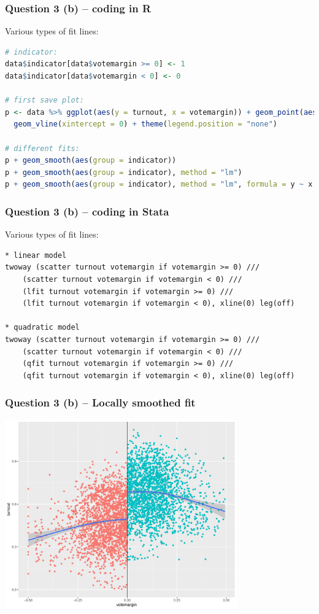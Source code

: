 \documentclass[xcolor=table,dvipsnames]{beamer}
\begin{document}
\begin{frame}[fragile]
\frametitle{Question 3 (b) -- coding in R}
Various types of fit lines:
\begin{lstlisting}[language=R]
# indicator:
data$indicator[data$votemargin >= 0] <- 1
data$indicator[data$votemargin < 0] <- 0

# first save plot:
p <- data %>% ggplot(aes(y = turnout, x = votemargin)) + geom_point(aes(colour = indicator)) + 
  geom_vline(xintercept = 0) + theme(legend.position = "none")

# different fits:
p + geom_smooth(aes(group = indicator))
p + geom_smooth(aes(group = indicator), method = "lm")
p + geom_smooth(aes(group = indicator), method = "lm", formula = y ~ x + I(x^2))
\end{lstlisting}
\end{frame}

\begin{frame}[fragile]
\frametitle{Question 3 (b) -- coding in Stata}
Various types of fit lines:
\begin{lstlisting}
* linear model
twoway (scatter turnout votemargin if votemargin >= 0) ///
	(scatter turnout votemargin if votemargin < 0) ///
	(lfit turnout votemargin if votemargin >= 0) ///
	(lfit turnout votemargin if votemargin < 0), xline(0) leg(off)

* quadratic model
twoway (scatter turnout votemargin if votemargin >= 0) ///
	(scatter turnout votemargin if votemargin < 0) ///
	(qfit turnout votemargin if votemargin >= 0) ///
	(qfit turnout votemargin if votemargin < 0), xline(0) leg(off)
\end{lstlisting}
\end{frame}

\begin{frame}
\frametitle{Question 3 (b) -- Locally smoothed fit}
\centering
\includegraphics[width=100mm]{pictures/week_22_3locfit.pdf} 
\end{frame}
\end{document}
